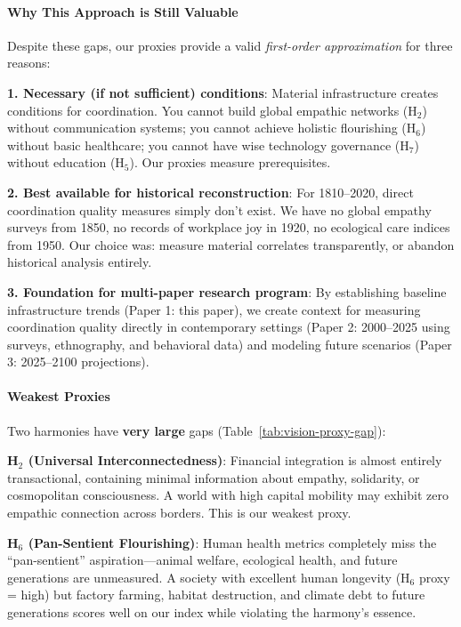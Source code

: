 \documentclass[11pt]{article}
\begin{document}
\paragraph{Why This Approach is Still Valuable}

Despite these gaps, our proxies provide a valid \textit{first-order
approximation} for three reasons:

\textbf{1. Necessary (if not sufficient) conditions}: Material infrastructure
creates conditions for coordination. You cannot build global empathic networks
(H$_2$) without communication systems; you cannot achieve holistic flourishing
(H$_6$) without basic healthcare; you cannot have wise technology governance
(H$_7$) without education (H$_5$). Our proxies measure prerequisites.

\textbf{2. Best available for historical reconstruction}: For 1810--2020, direct
coordination quality measures simply don't exist. We have no global empathy
surveys from 1850, no records of workplace joy in 1920, no ecological care
indices from 1950. Our choice was: measure material correlates transparently, or
abandon historical analysis entirely.

\textbf{3. Foundation for multi-paper research program}: By establishing
baseline infrastructure trends (Paper 1: this paper), we create context for
measuring coordination quality directly in contemporary settings (Paper 2:
2000--2025 using surveys, ethnography, and behavioral data) and modeling future
scenarios (Paper 3: 2025--2100 projections).

\paragraph{Weakest Proxies}

Two harmonies have \textbf{very large} gaps (Table~\ref{tab:vision-proxy-gap}):

\textbf{H$_2$ (Universal Interconnectedness)}: Financial integration is almost
entirely transactional, containing minimal information about empathy, solidarity,
or cosmopolitan consciousness. A world with high capital mobility may exhibit
zero empathic connection across borders. This is our weakest proxy.

\textbf{H$_6$ (Pan-Sentient Flourishing)}: Human health metrics completely miss
the ``pan-sentient'' aspiration---animal welfare, ecological health, and future
generations are unmeasured. A society with excellent human longevity (H$_6$
proxy = high) but factory farming, habitat destruction, and climate debt to
future generations scores well on our index while violating the harmony's
essence.
\end{document}
